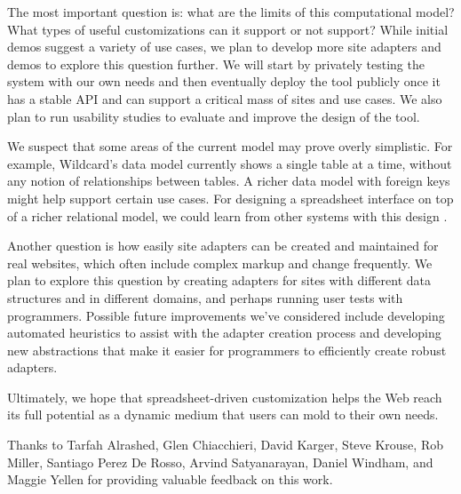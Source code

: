 \documentclass[english]{programming}
\begin{document}
The most important question is: what are the limits of this
computational model? What types of useful customizations can it support
or not support? While initial demos suggest a variety of use cases, we
plan to develop more site adapters and demos to explore this question
further. We will start by privately testing the system with our own
needs and then eventually deploy the tool publicly once it has a stable
API and can support a critical mass of sites and use cases. We also plan
to run usability studies to evaluate and improve the design of the tool.

We suspect that some areas of the current model may prove overly
simplistic. For example, Wildcard's data model currently shows a single
table at a time, without any notion of relationships between tables. A
richer data model with foreign keys might help support certain use
cases. For designing a spreadsheet interface on top of a richer
relational model, we could learn from other systems with this design
\autocite{mccutchen2016,bakke2016}.

Another question is how easily site adapters can be created and
maintained for real websites, which often include complex markup and
change frequently. We plan to explore this question by creating adapters
for sites with different data structures and in different domains, and
perhaps running user tests with programmers. Possible future
improvements we've considered include developing automated heuristics to
assist with the adapter creation process and developing new abstractions
that make it easier for programmers to efficiently create robust
adapters.

Ultimately, we hope that spreadsheet-driven customization helps the Web
reach its full potential as a dynamic medium that users can mold to
their own needs.

\acks
Thanks to Tarfah Alrashed, Glen Chiacchieri, David Karger, Steve Krouse, Rob Miller, Santiago Perez De Rosso, Arvind Satyanarayan, Daniel Windham, and Maggie Yellen for providing valuable feedback on this work.

\printbibliography
\end{document}
